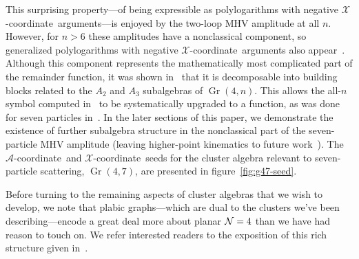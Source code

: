 \documentclass[12pt]{article}
\DeclareMathOperator{\Gr}{Gr}
\def\xcoord{$\mathcal{X}$-coordinate}
\def\acoord{$\mathcal{A}$-coordinate}
\begin{document}
This surprising property---of being expressible as polylogarithms with negative \xcoord\ arguments---is enjoyed by the two-loop MHV amplitude at all $n$. However, for $n>6$ these amplitudes have a nonclassical component, so generalized polylogarithms with negative \xcoord\ arguments also appear~\cite{Golden:2013xva}. Although this component represents the mathematically most complicated part of the remainder function, it was shown in~\cite{Golden:2014xqa} that it is decomposable into building blocks related to the $A_2$ and $A_3$ subalgebras of $\Gr(4,n)$. This allows the all-$n$ symbol computed in~\cite{CaronHuot:2011ky} to be systematically upgraded to a function, as was done for seven particles in~\cite{Golden:2014xqf}. In the later sections of this paper, we demonstrate the existence of further subalgebra structure in the nonclassical part of the seven-particle MHV amplitude (leaving higher-point kinematics to future work~\cite{cluster_subalgebras_ii}). The \acoord\ and \xcoord\ seeds for the cluster algebra relevant to seven-particle scattering, $\Gr(4,7)$, are presented in figure~\ref{fig:g47-seed}.

Before turning to the remaining aspects of cluster algebras that we wish to develop, we note that plabic graphs---which are dual to the clusters we've been describing---encode a great deal more about planar ${\cal N}=4$ than we have had reason to touch on. We refer interested readers to the exposition of this rich structure given in~\cite{ArkaniHamed:2012nw}.
\end{document}
